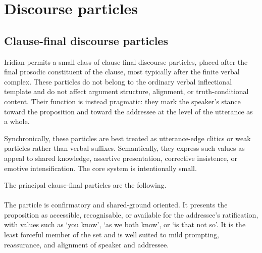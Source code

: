 
\section{Discourse particles}\label{sec:discourse-particles}\label{sec:discourse-word-order}


\subsection{Clause-final discourse particles}\label{sec:disc-final-particles}

Iridian permits a small class of clause-final discourse particles, placed after
the final prosodic constituent of the clause, most typically after the finite
verbal complex. These particles do not belong to the ordinary verbal
inflectional template and do not affect argument structure, alignment, or
truth-conditional content. Their function is instead pragmatic: they mark the
speaker's stance toward the proposition and toward the addressee at the level of
the utterance as a whole.

Synchronically, these particles are best treated as utterance-edge clitics or
weak particles rather than verbal suffixes. Semantically, they express such
values as appeal to shared knowledge, assertive presentation, corrective
insistence, or emotive intensification. The core system is intentionally small.

The principal clause-final particles are the following.

\paragraph{} The particle  is confirmatory and shared-ground
oriented. It presents the proposition as accessible, recognisable, or available
for the addressee's ratification, with values such as `you know', `as we both
know', or `is that not so'. It is the least forceful member of the set and is
well suited to mild prompting, reassurance, and alignment of speaker and
addressee.


